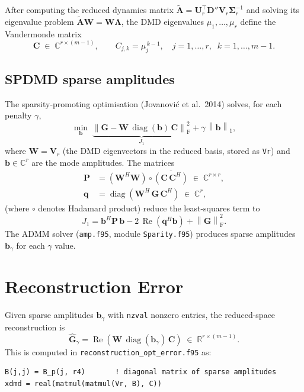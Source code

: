 \documentclass[11pt,a4paper]{article}
\newcommand{\norm}[1]{\left\lVert #1 \right\rVert}
\newcommand{\Fro}{\mathrm{F}}
\newcommand{\diag}{\operatorname{diag}}
\newcommand{\Reop}{\operatorname{Re}}
\newcommand{\Sigmat}{\bm{\Sigma}}
\begin{document}
After computing the reduced dynamics matrix $\tilde{\bm{A}} = \bm{U}_r^\top \bm{D}''\bm{V}_r\Sigmat_r^{-1}$ and solving its eigenvalue problem $\tilde{\bm{A}}\bm{W} = \bm{W}\bm{\Lambda}$, the DMD eigenvalues $\mu_1,\ldots,\mu_r$ define the Vandermonde matrix
\begin{equation}\label{eq:Vand}
\bm{C} \;\in\; \mathbb{C}^{r \times (m-1)}, \qquad C_{j,k} = \mu_j^{\,k-1}, \quad j=1,\ldots,r,\;\; k=1,\ldots,m-1.
\end{equation}

\subsection{SPDMD sparse amplitudes}

The sparsity-promoting optimisation (Jovanovi\'c et al.\ 2014) solves, for each penalty $\gamma$,
\begin{equation}
\min_{\bm{b}} \;\underbrace{\norm{\bm{G} - \bm{W}\,\diag(\bm{b})\,\bm{C}}_\Fro^2}_{J_1} + \gamma\,\norm{\bm{b}}_1,
\end{equation}
where $\bm{W} = \bm{V}_r$ (the DMD eigenvectors in the reduced basis, stored as \texttt{Vr}) and $\bm{b}\in\mathbb{C}^r$ are the mode amplitudes.  The matrices
\begin{align}
\bm{P} &= \left(\bm{W}^H \bm{W}\right) \circ \overline{\left(\bm{C}\,\bm{C}^H\right)} \;\in\;\mathbb{C}^{r\times r}, \label{eq:P}\\
\bm{q} &= \diag\!\left(\bm{W}^H\,\bm{G}\,\bm{C}^H\right) \;\in\;\mathbb{C}^{r}, \label{eq:q}
\end{align}
(where $\circ$ denotes Hadamard product) reduce the least-squares term to
\begin{equation}
J_1 = \bm{b}^H \bm{P}\,\bm{b} - 2\,\Reop\!\left(\bm{q}^H \bm{b}\right) + \norm{\bm{G}}_\Fro^2.
\end{equation}
The ADMM solver (\texttt{amp.f95}, module \texttt{Sparity.f95}) produces sparse amplitudes $\bm{b}_\gamma$ for each $\gamma$ value.

\section{Reconstruction Error}

Given sparse amplitudes $\bm{b}_\gamma$ with \texttt{nzval} nonzero entries, the reduced-space reconstruction is
\begin{equation}\label{eq:Xdmd}
\hat{\bm{G}}_\gamma = \Reop\!\left(\bm{W}\,\diag(\bm{b}_\gamma)\,\bm{C}\right) \;\in\; \mathbb{R}^{r \times (m-1)}.
\end{equation}
This is computed in \texttt{reconstruction\_opt\_error.f95} as:
\begin{verbatim}
B(j,j) = B_p(j, r4)       ! diagonal matrix of sparse amplitudes
xdmd = real(matmul(matmul(Vr, B), C))
\end{verbatim}
\end{document}
